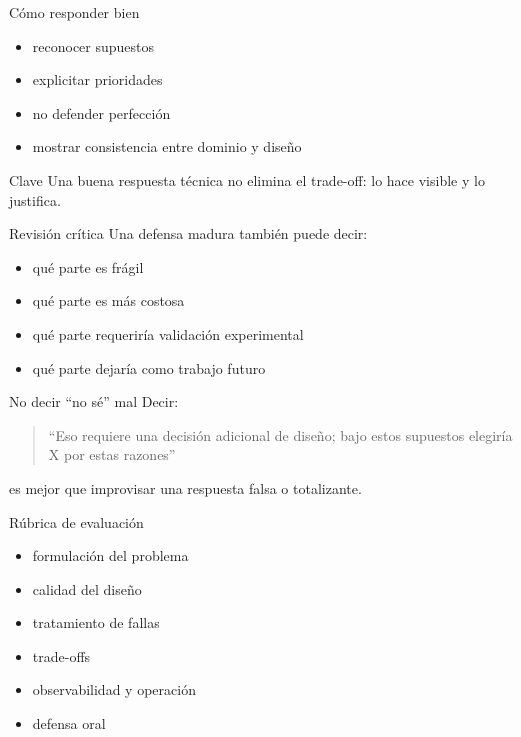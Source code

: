 \documentclass[institutional,screen,none]{ua-engineering-v6-beamer}
\begin{document}
\begin{frame}{Cómo responder bien}
\begin{itemize}
\item reconocer supuestos
\item explicitar prioridades
\item no defender perfección
\item mostrar consistencia entre dominio y diseño
\end{itemize}

\pause

\begin{block}{Clave}
Una buena respuesta técnica no elimina el trade-off: lo hace visible y lo justifica.
\end{block}
\end{frame}


\begin{frame}{Revisión crítica}
Una defensa madura también puede decir:
\begin{itemize}
\item qué parte es frágil
\item qué parte es más costosa
\item qué parte requeriría validación experimental
\item qué parte dejaría como trabajo futuro
\end{itemize}
\end{frame}

\begin{frame}{No decir “no sé” mal}
Decir:
\begin{quote}
“Eso requiere una decisión adicional de diseño; bajo estos supuestos elegiría X por estas razones”
\end{quote}

es mejor que improvisar una respuesta falsa o totalizante.
\end{frame}


\begin{frame}{Rúbrica de evaluación}
\begin{itemize}
\item formulación del problema
\item calidad del diseño
\item tratamiento de fallas
\item trade-offs
\item observabilidad y operación
\item defensa oral
\end{itemize}
\end{frame}
\end{document}
